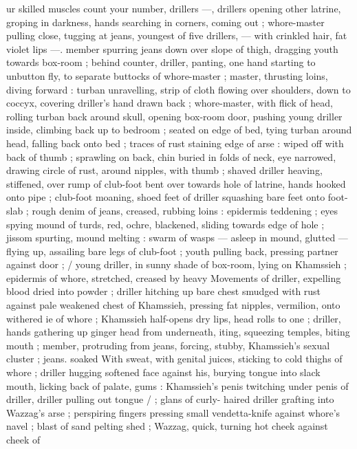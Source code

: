 ur skilled muscles{\thd} count your number, drillers{\td} {\gr} ---, drillers 
opening other latrine, groping in darkness, hands searching in 
corners, coming out ; whore-master pulling close, tugging at jeans, 
youngest of five drillers, --- with crinkled hair, fat violet lips ---. 
member spurring jeans down over slope of thigh, dragging youth 
towards box-room ; behind counter, driller, panting, one hand 
starting to unbutton fly, to separate buttocks of whore-master ; 
master, thrusting loins, diving forward : turban unravelling, strip of 
cloth flowing over shoulders, down to coccyx, covering driller's hand 
drawn back ; whore-master, with flick of head, rolling turban back 
around skull, opening box-room door, pushing young driller inside, 
climbing back up to bedroom ; seated on edge of bed, tying turban 
around head, falling back onto bed ; traces of rust staining edge of 
arse : wiped off with back of thumb ; sprawling on back, chin buried 
in folds of neck, eye narrowed, drawing circle of rust, around 
nipples, with thumb ; shaved driller heaving, stiffened, over rump of 
club-foot bent over towards hole of latrine, hands hooked onto pipe 
; club-foot moaning, shoed feet of driller squashing bare feet onto 
foot-slab ; rough denim of jeans, creased, rubbing loins : epidermis 
teddening ; eyes spying mound of turds, red, ochre, blackened, 
sliding towards edge of hole ; jissom spurting, mound melting : 
swarm of wasps --- asleep in mound, glutted --- flying up, assailing 
bare legs of club-foot ; youth pulling back, pressing partner against 
door ; {\slash} young driller, in sunny shade of box-room, lying on 
Khamssieh ; epidermis of whore, stretched, creased by heavy 
Movements of driller, expelling blood dried into powder ; driller 
hitching up bare chest smudged with rust against pale weakened 
chest of Khamssieh, pressing fat nipples, vermilion, onto withered 
ie of whore ; Khamssieh half-opens dry lips, head rolls to one 
; driller, hands gathering up ginger head from underneath, 
iting, squeezing temples, biting mouth ; member, protruding from 
jeans, forcing, stubby, Khamssieh's sexual cluster ; jeans. soaked 
With sweat, with genital juices, sticking to cold thighs of whore ; 
driller hugging softened face against his, burying tongue into slack 
mouth, licking back of palate, gums : Khamssieh's penis twitching 
under penis of driller, driller pulling out tongue {\slash} ; glans of curly- 
haired driller grafting into Wazzag's arse ; perspiring fingers 
pressing small vendetta-knife against whore's navel ; blast of sand 
pelting shed ; Wazzag, quick, turning hot cheek against cheek of 
